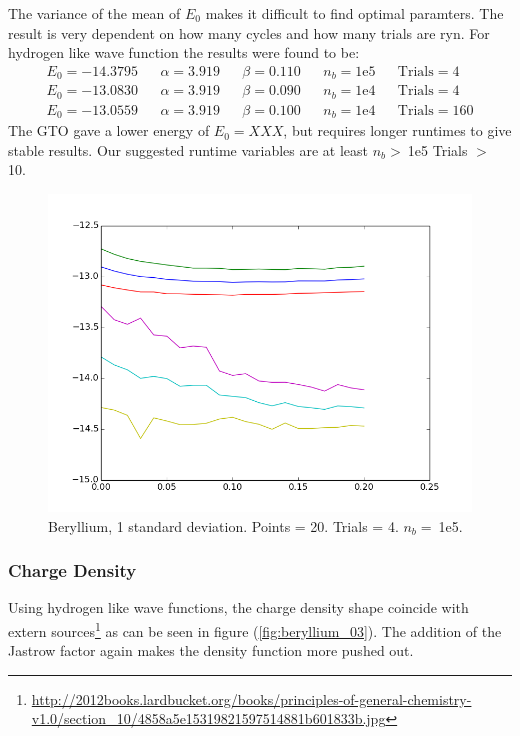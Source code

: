 \documentclass[twocolumn,fleqn,8pt]{article}  %
\begin{document}
\noindent 
The variance of the mean of $E_0$ makes it difficult to find optimal paramters.
The result is very dependent on how many cycles and how many trials are ryn.
For hydrogen like wave function the results were found to be:
\begin{align*}
	E_0 = -14.3795 && \alpha = 3.919 && \beta = 0.110 && n_b = \text{1e5}&&\text{Trials} = 4\\
	E_0 = -13.0830 && \alpha = 3.919 && \beta = 0.090 && n_b = \text{1e4}&&\text{Trials} = 4\\
	E_0 = -13.0559 && \alpha = 3.919 && \beta = 0.100 && n_b = \text{1e4}&&\text{Trials} = 160
\end{align*}
The GTO gave a lower energy of $E_0 = XXX$, but requires longer runtimes to give 
stable results. Our suggested runtime variables are at least $n_b > \:$1e5 Trials $>$ 10.
\begin{figure}
	\includegraphics[width=\columnwidth]{../res/plot/beryllium_01/beryllium_01.png}
	\caption{Beryllium, 1 standard deviation. 
	Points = 20. Trials = 4.	$n_b = \:$1e5.}
	\label{fig:helium_03}
\end{figure}

\subsubsection{Charge Density}
Using hydrogen like wave functions, the charge density shape coincide with extern 
sources\footnote{\url{http://2012books.lardbucket.org/books/principles-of-general-chemistry-v1.0/section_10/4858a5e15319821597514881b601833b.jpg}} as can be seen in figure
(\ref{fig:beryllium_03}). The addition of the Jastrow factor again makes the
density function more pushed out. 
\end{document}
